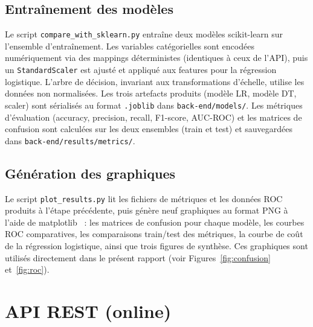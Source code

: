 \documentclass[12pt,a4paper,openany]{report}
\newcommand{\file}[1]{\texttt{#1}}
\begin{document}
\subsection{Entraînement des modèles}

Le script \file{compare\_with\_sklearn.py} entraîne deux modèles scikit-learn sur l'ensemble d'entraînement. Les variables catégorielles sont encodées numériquement via des mappings déterministes (identiques à ceux de l'API), puis un \texttt{StandardScaler} est ajusté et appliqué aux features pour la régression logistique. L'arbre de décision, invariant aux transformations d'échelle, utilise les données non normalisées. Les trois artefacts produits (modèle LR, modèle DT, scaler) sont sérialisés au format \texttt{.joblib} dans \file{back-end/models/}. Les métriques d'évaluation (accuracy, precision, recall, F1-score, AUC-ROC) et les matrices de confusion sont calculées sur les deux ensembles (train et test) et sauvegardées dans \file{back-end/results/metrics/}.

\subsection{Génération des graphiques}

Le script \file{plot\_results.py} lit les fichiers de métriques et les données ROC produits à l'étape précédente, puis génère neuf graphiques au format PNG à l'aide de matplotlib~\cite{matplotlib} : les matrices de confusion pour chaque modèle, les courbes ROC comparatives, les comparaisons train/test des métriques, la courbe de coût de la régression logistique, ainsi que trois figures de synthèse. Ces graphiques sont utilisés directement dans le présent rapport (voir Figures~\ref{fig:confusion} et~\ref{fig:roc}).

\section{API REST (online)}
\end{document}
